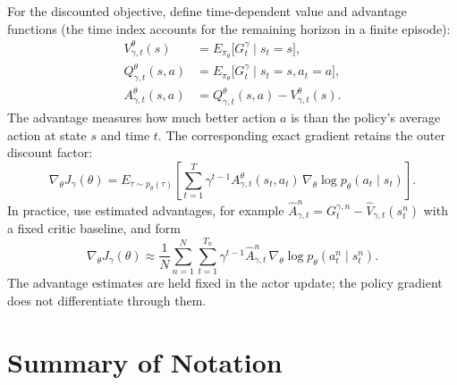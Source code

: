 \documentclass[11pt, a4paper]{article}
\begin{document}
For the discounted objective, define time-dependent value and advantage functions (the time index accounts for the remaining horizon in a finite episode):
\begin{align}
    V_{\gamma,t}^\theta(s) &= E_{\pi_\theta}\big[G_t^\gamma \mid s_t=s\big],\label{eq:pg-discounted-state-value} \\
    Q_{\gamma,t}^\theta(s,a) &= E_{\pi_\theta}\big[G_t^\gamma \mid s_t=s, a_t=a\big],\label{eq:pg-discounted-action-value} \\
    A_{\gamma,t}^\theta(s,a) &= Q_{\gamma,t}^\theta(s,a) - V_{\gamma,t}^\theta(s).\label{eq:pg-discounted-advantage}
\end{align}
The advantage measures how much better action $a$ is than the policy's average action at state $s$ and time $t$. The corresponding exact gradient retains the outer discount factor:
\begin{equation}\label{eq:pg-advantage-gradient}
    \nabla_\theta J_\gamma(\theta) = E_{\tau \sim p_\theta(\tau)}\left[\sum_{t=1}^{T} \gamma^{t-1} A_{\gamma,t}^\theta(s_t,a_t) \, \nabla_\theta \log p_\theta(a_t \mid s_t)\right].
\end{equation}
In practice, use estimated advantages, for example $\hat{A}_{\gamma,t}^n = G_t^{\gamma,n} - \hat{V}_{\gamma,t}(s_t^n)$ with a fixed critic baseline, and form
\begin{equation}\label{eq:pg-estimated-advantage-gradient}
    \nabla_\theta J_\gamma(\theta) \approx \frac{1}{N} \sum_{n=1}^{N} \sum_{t=1}^{T_n} \gamma^{t-1} \hat{A}_{\gamma,t}^n \, \nabla_\theta \log p_\theta(a_t^n \mid s_t^n).
\end{equation}
The advantage estimates are held fixed in the actor update; the policy gradient does not differentiate through them.

\section{Summary of Notation}
\end{document}

